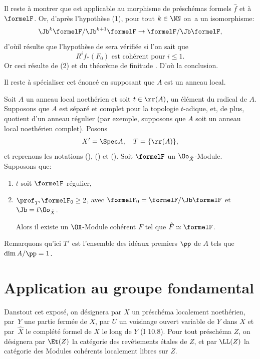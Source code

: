 Il reste \`a montrer que  est applicable au morphisme de pr\'esch\'emas formels $\hat{f}$ et \`a $\formelF$. Or, d'apr\`es l'hypoth\`ese (1), pour tout $k\in \NN$ on~a un isomorphisme:
\begin{equation*} {\Jb}^k \formelF /{\Jb}^{k+1}\formelF \to \formelF / {\Jb} \formelF,
\end{equation*}
d'o\`u\pageoriginaled il r\'esulte que l'hypoth\`ese de  sera v\'erifi\'ee si l'on sait que
\[
R^if_*(F_0)\text{ est coh\'erent pour }i \leq 1.
\]
Or ceci r\'esulte de (2) et du th\'eor\`eme de finitude . D'o\`u la conclusion.

Il reste \`a sp\'ecialiser cet \'enonc\'e en supposant que $A$ est un anneau local.

\begin{corollaire}\setcounter{equation}{8} \label{IX.2.3}
Soit $A$ un anneau local noeth\'erien et soit $t \in \rr(A)$, un \'el\'ement du radical de $A$. Supposons que $A$ est s\'epar\'e et complet pour la topologie $t$-adique, et, de plus, quotient d'un anneau r\'egulier (par exemple, supposons que $A$ soit un anneau local noeth\'erien complet). Posons
\begin{equation} \label{eq:IX.2.9} X'=\Spec A, \quad T = \{ \rr(A) \},
\end{equation}
et reprenons les notations (), () et (). Soit $\formelF$ un $\Oo_{\hat{X}}$-Module. Supposons que:
\begin{enumerate}
\item
$t$ soit $\formelF$-r\'egulier,
\item
$\prof_{T'} \formelF_0 \geq 2$, avec $\formelF_0=\formelF/{\Jb}\formelF$ et ${\Jb}=t\Oo_{\hat{X}}$.

Alors il existe un $\OX$-Module coh\'erent $F$ tel que $\hat{F}\simeq \formelF$.
\end{enumerate}
\end{corollaire}

Remarquons qu'ici $T'$ est l'ensemble des id\'eaux premiers $\pp$ de $A$ tels que \hbox{$\dim A/\pp =1$}.


\chapter{Application au groupe fondamental} \label{X}

\renewcommand{\theequation}{\arabic{equation}}

Dans\pageoriginale tout cet expos\'e, on d\'esignera par $X$ un pr\'esch\'ema localement noeth\'erien, par~$Y$ une partie ferm\'ee de $X$, par $U$ un voisinage ouvert variable de $Y$ dans $X$ et par~$\hat{X}$ le compl\'et\'e formel de $X$ le long de $Y$ (\EGA I 10.8). Pour tout pr\'esch\'ema $Z$, on d\'esignera par $\Et(Z)$ la cat\'egorie des rev\^etements \'etales de $Z$, et par $\LL(Z)$\label{pX.1} la cat\'egorie des Modules coh\'erents localement libres sur $Z$.

